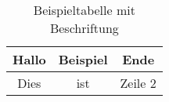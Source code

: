 \begin{table}
  \begin{tabular}{c|c|c}
    Hallo & Beispiel & Ende \\
    \hline
    Dies  & ist      & Zeile 2 \\
  \end{tabular}
  \caption{Beispieltabelle mit
            Beschriftung}
\end{table}
